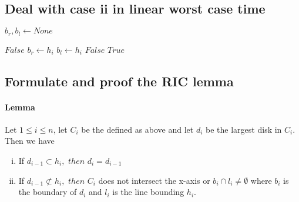\documentclass{article}
\begin{document}
\newpage
\subsection{Deal with case ii in linear worst case time}
\begin{algorithmic}[1]
		\State
		$b_r, b_l \gets None$

				\State
				\Return $False$
			\EndIf
			\State
			\State
				$b_r \gets h_i$
			\EndIf
			\State
				$b_l \gets h_i$
			\EndIf
				\State
				\Return $False$
			\EndIf
		\EndFor
		\State
		\Return $True$
	\EndFunction
\end{algorithmic}
\subsection{Formulate and proof the RIC lemma}
\paragraph{Lemma}
Let $1 \leq i \leq n$, let $C_i$ be the defined as above and let $d_i$ be
the largest disk in $C_i$. Then we have
\begin{enumerate}[(i)]
	\item If $d_{i-1} \subset h_i,$ $then$ $d_i = d_{i-1}$
	\item If $d_{i-1} \not\subset h_{i},$ $then$ $C_i$ does not intersect the x-axis
		or $b_i \cap l_i \neq \emptyset$ where $b_i$ is the boundary of $d_i$ and $l_i$
		is the line bounding $h_i$.
\end{enumerate}
\end{document}
